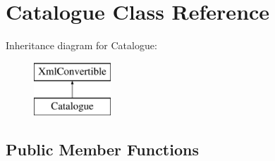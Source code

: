 \hypertarget{classCatalogue}{\section{Catalogue Class Reference}
\label{classCatalogue}
}
Inheritance diagram for Catalogue\+:\begin{figure}[H]
\begin{center}
\leavevmode
\includegraphics[height=2.000000cm]{classCatalogue}
\end{center}
\end{figure}
\subsection*{Public Member Functions}
